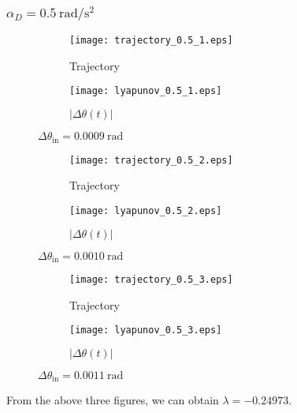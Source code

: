 \documentclass[a4paper]{article}
\begin{document}
	\subsubsection{$\alpha _D = 0.5\mathrm{~rad/s^2}$}
	\begin{figure}[H]
		\centering
		\begin{subfigure}{0.85\textwidth}
		\texttt{[image: trajectory\_0.5\_1.eps]}
		\caption{Trajectory}	
		\end{subfigure}
		\begin{subfigure}{0.85\textwidth}
		\texttt{[image: lyapunov\_0.5\_1.eps]}
		\caption{$|\Delta\theta(t)|$}	
		\end{subfigure}
		\caption{$\Delta\theta_{\mathrm{in}} = 0.0009\mathrm{~rad}$}
	\end{figure}
	\newpage
	\begin{figure}[H]
		\centering
		\begin{subfigure}{0.85\textwidth}
		\texttt{[image: trajectory\_0.5\_2.eps]}
		\caption{Trajectory}	
		\end{subfigure}
		\begin{subfigure}{0.85\textwidth}
		\texttt{[image: lyapunov\_0.5\_2.eps]}
		\caption{$|\Delta\theta(t)|$}	
		\end{subfigure}
		\caption{$\Delta\theta_{\mathrm{in}} = 0.0010\mathrm{~rad}$}
	\end{figure}
	\newpage
	\begin{figure}[H]
		\centering
		\begin{subfigure}{0.85\textwidth}
		\texttt{[image: trajectory\_0.5\_3.eps]}
		\caption{Trajectory}	
		\end{subfigure}
		\begin{subfigure}{0.85\textwidth}
		\texttt{[image: lyapunov\_0.5\_3.eps]}
		\caption{$|\Delta\theta(t)|$}	
		\end{subfigure}
		\caption{$\Delta\theta_{\mathrm{in}} = 0.0011\mathrm{~rad}$}
	\end{figure}
	From the above three figures, we can obtain $\lambda = -0.24973$.
	\newpage
\end{document}
